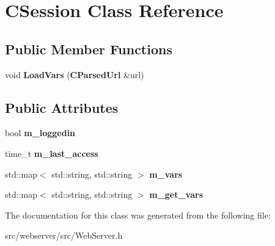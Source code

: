 \section{CSession Class Reference}
\label{classCSession}
\subsection*{Public Member Functions}
\begin{DoxyCompactItemize}
\item 
void {\bfseries LoadVars} ({\bf CParsedUrl} \&url)\label{classCSession_a22cb45408569769cc68873ba9bcecbad}

\end{DoxyCompactItemize}
\subsection*{Public Attributes}
\begin{DoxyCompactItemize}
\item 
bool {\bfseries m\_\-loggedin}\label{classCSession_a92f2fc952f2acff427991c3faa212794}

\item 
time\_\-t {\bfseries m\_\-last\_\-access}\label{classCSession_a058ec7f17878da31dc4bbd8965e96d5f}

\item 
std::map$<$ std::string, std::string $>$ {\bfseries m\_\-vars}\label{classCSession_a5d7b690561367343ee7d22badfb17ae7}

\item 
std::map$<$ std::string, std::string $>$ {\bfseries m\_\-get\_\-vars}\label{classCSession_a98945e5b09b27982cb3f463d81b48f22}

\end{DoxyCompactItemize}


The documentation for this class was generated from the following file:\begin{DoxyCompactItemize}
\item 
src/webserver/src/WebServer.h\end{DoxyCompactItemize}
